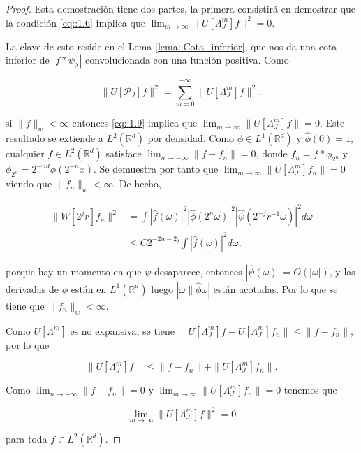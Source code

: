 \begin{proof}
  Esta demostración tiene dos partes, la primera consistirá en demostrar que la condición \eqref{eq::1.6} implica que $\lim_{m\rightarrow \infty} \| U[\Lambda_J^m]f \|^2=0$. 
  
  \medskip

  \noindent La clave de esto reside en el Lema \ref{lema::Cota_inferior}, que nos da una cota inferior de $|f\ast\psi_\lambda|$ convolucionada con una función positiva. Como 

  $$ \| U[\mathcal{P}_J]f \|^2= \sum_{m=0}^{+\infty} \|U[\Lambda_J^m]f\|^2,$$

  \noindent si $\|f\|_w < \infty$ entonces \eqref{eq::1.9} implica que $\lim_{m\rightarrow\infty}\|U[\Lambda_J^m]f\|= 0$. Este resultado se extiende a $L^2(\mathbb{R}^d)$ por densidad. Como $\phi \in L^1(\mathbb{R}^d)$ y $\widehat{\phi}(0)=1$, cualquier $f\in L^2(\mathbb{R}^d)$ satisface $\lim_{n\rightarrow - \infty} \|f-f_n\|=0$, donde $f_n=f \ast \phi_{2^n}$ y $\phi_{2^n}=2^{-nd} \phi(2^{-n}x)$. Se demuestra por tanto que $\lim_{m\rightarrow \infty} \|U[\Lambda_J^m]f_n\|=0$ viendo que $\|f_n\|_w < \infty$. De hecho, 


  \begin{align*}
      \|W[2^jr]f_n\|^2 &= \int |\widehat{f}(\omega)|^2 |\widehat{\phi}(2^n \omega)|^2 |\widehat{\psi}(2^{-j}r^{-1}\omega)|^2 d\omega \\
      &\leq C 2^{-2n-2j} \int |\widehat{f}(\omega)|^2 d\omega,
  \end{align*}

  \noindent porque hay un momento en que $\psi$ desaparece, entonces $|\widehat{\psi}(\omega)|=O(|\omega|)$, y las derivadas de $\phi$ están en $L^1(\mathbb{R}^d)$ luego $|\omega\|\widehat{\phi}\omega|$ están acotadas. Por lo que se tiene que $\|f_n\|_w < \infty$.

  \medskip

  \noindent Como $U[\Lambda^m]$ es no expansiva, se tiene $\|U[\Lambda_J^m]f-U[\Lambda_J^m]f_n\| \leq \|f - f_n\|$, por lo que 

  $$\|U[\Lambda_J^m]f\| \leq \| f-f_n\| + \|U[\Lambda_J^m]f_n\|.$$

  \noindent Como $\lim_{n\rightarrow -\infty}\|f-f_n\|=0$ y $\lim_{m\rightarrow\infty}\|U[\Lambda_J^m]f_n\|=0$ tenemos que 

  $$\lim_{m\rightarrow\infty} \|U[\Lambda_J^m]f\|^2=0$$

  \noindent para toda $f \in L^2(\mathbb{R}^d)$. 


\end{proof}
